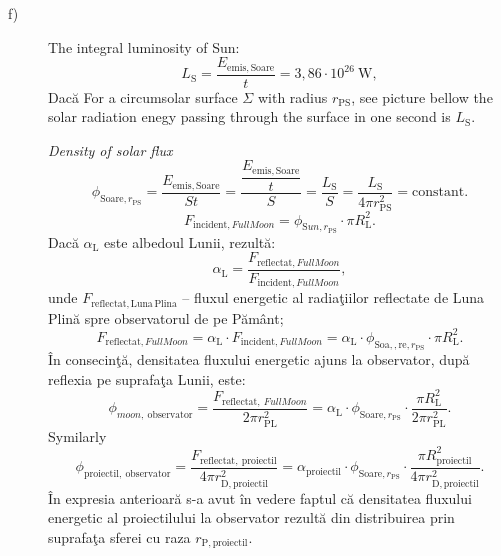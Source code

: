 \begin{description}
\item[f)] The integral luminosity of Sun:
  \[
    L_{\mathrm{S}} = \frac{E_{\mathrm{emis,Soare}}}{t}
      = 3{,}86\cdot10^{26}\ \mathrm{W},
  \]
  Dac\u{a} For a circumsolar surface $\Sigma$ with radius %
  $r_{\mathrm{PS}}$, see picture bellow the solar radiation enegy passing %
  through the surface in one second is $L_{\mathrm{S}}$.


  \textit{Density of solar flux}
  \[
    \phi_{\mathrm{Soare},r_{\mathrm{PS}}}
      = \frac{E_{\mathrm{emis,Soare}}}{St}
      = \frac{\dfrac{E_{\mathrm{emis,Soare}}}{t}}{S}
      = \frac{L_{\mathrm{S}}}{S}
      = \frac{L_{\mathrm{S}}}{4\pi r_{\mathrm{PS}}^2}
      = \text{constant}.
  \]
  \[
    F_{\mathrm{incident},FullMoon}
      = \phi_{\mathrm{S}un,r_{\mathrm{PS}}}\cdot\pi R_{\mathrm{L}}^2.
  \]
  Dac\u{a} $\alpha_{\mathrm{L}}$ este albedoul Lunii, rezult\u{a}: %
  \[
    \alpha_{\mathrm{L}} = \frac{F_{\mathrm{reflectat},FullMoon}}
      {F_{\mathrm{incident},FullMoon}},
  \]
  unde $F_{\mathrm{reflectat,Luna\,Plina}}$ -- fluxul energetic al
  radia\c{t}iilor reflectate de Luna Plin\u{a} spre observatorul de pe
  P\u{a}m\^ant;
  \[
    F_{\mathrm{reflectat},FullMoon}
      = \alpha_{\mathrm{L}}\cdot F_{\mathrm{incident},FullMoon}
      = \alpha_{\mathrm{L}}\cdot
        \phi_{\mathrm{Soa,,re},r_{\mathrm{PS}}}\cdot %
        \pi R_{\mathrm{L}}^2.
  \]
  \^In consecin\c{t}\u{a}, densitatea fluxului energetic ajuns la observator,
  dup\u{a} reflexia pe suprafa\c{t}a Lunii, este:
  \[
    \phi_{moon,\ \mathrm{observator}}
      = \frac{F_{\mathrm{reflectat},\ FullMoon}}{2\pi r_{\mathrm{PL}}^2}
      = \alpha_{\mathrm{L}}\cdot\phi_{\mathrm{Soare},r_{\mathrm{PS}}}\cdot
        \frac{\pi R_{\mathrm{L}}^2}{2\pi r_{\mathrm{PL}}^2}.
  \]
  Symilarly %
  \[
    \phi_{\mathrm{proiectil,\ observator}}
      = \frac{F_{\mathrm{reflectat,\ proiectil}}}
        {4\pi r_{\mathrm{D,proiectil}}^2}
      = \alpha_{\mathrm{proiectil}}\cdot
        \phi_{\mathrm{Soare},r_{\mathrm{PS}}}\cdot
        \frac{\pi R_{\mathrm{proiectil}}^2}{4\pi r_{\mathrm{D,proiectil}}^2}.
  \]
  \^In expresia anterioar\u{a} s-a avut \^in vedere faptul c\u{a} densitatea
  fluxului energetic al proiectilului la observator rezult\u{a} din
  distribuirea prin suprafa\c{t}a sferei cu raza $r_{\mathrm{P,proiectil}}$.


\end{description}
